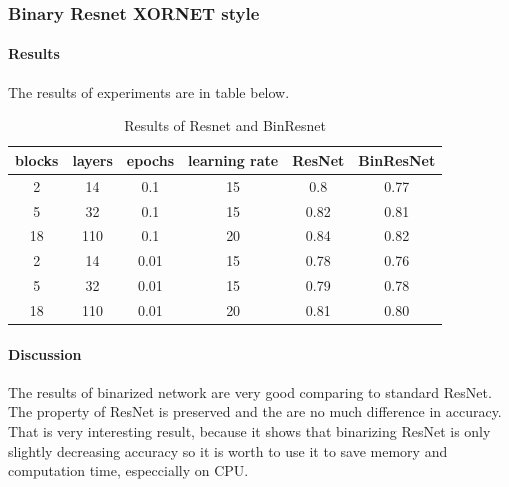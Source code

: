 \documentclass[licencjacka]{pracamgr}
\begin{document}
			\subsubsection{Binary Resnet XORNET style}
		        \paragraph{Results} 
		        
		        The results of experiments are in table below.
		        \begin{table}[H]
		                        \caption{Results of Resnet and BinResnet}
		                        \centering
		                        \begin{tabular}{c c c c c c}
		                        \hline\hline
		                        blocks & layers & epochs & learning rate & ResNet & BinResNet  \\ [0.5ex]
		                        \hline
		                                2 & 14  & 0.1   & 15 & 0.8 & 0.77 \\
		                                5 & 32  & 0.1   & 15 & 0.82 & 0.81 \\
		                                18      & 110 & 0.1     & 20 & 0.84 & 0.82\\
		                        \hline
		                                2 & 14  & 0.01  & 15 & 0.78 & 0.76 \\
		                                5 & 32  & 0.01  & 15 & 0.79 & 0.78 \\
		                                18 & 110 & 0.01 & 20 & 0.81 & 0.80 \\
		                        \hline
		                        \end{tabular}
		                        \label{table:nonlin}
		                \end{table}

		        \paragraph{Discussion} 

		        The results of binarized network are very good comparing to standard ResNet. The property of ResNet is preserved and the are no much difference in accuracy. That is very interesting result, because it shows that binarizing ResNet is only slightly decreasing accuracy so it is worth to use it to save memory and computation time, especcially on CPU.
\end{document}
